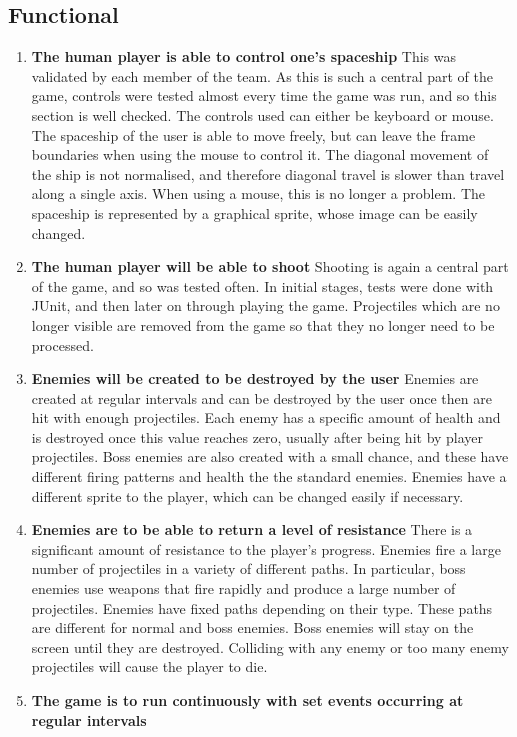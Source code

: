 \subsection{Functional}
\begin{enumerate}
\item \textbf{The human player is able to control one's spaceship}
This was validated by each member of the team. As this is such a central part of the game, controls were tested almost every time the game was run, and so this section is well checked. The controls used can either be keyboard or mouse. The spaceship of the user is able to move freely, but can leave the frame boundaries when using the mouse to control it. The diagonal movement of the ship is not normalised, and therefore diagonal travel is slower than travel along a single axis. When using a mouse, this is no longer a problem. The spaceship is represented by a graphical sprite, whose image can be easily changed.
\item \textbf{The human player will be able to shoot}
Shooting is again a central part of the game, and so was tested often. In initial stages, tests were done with JUnit, and then later on through playing the game. Projectiles which are no longer visible are removed from the game so that they no longer need to be processed.
\item \textbf{Enemies will be created to be destroyed by the user}
Enemies are created at regular intervals and can be destroyed by the user once then are hit with enough projectiles. Each enemy has a specific amount of health and is destroyed once this value reaches zero, usually after being hit by player projectiles. Boss enemies are also created with a small chance, and these have different firing patterns and health the the standard enemies. Enemies have a different sprite to the player, which can be changed easily if necessary.
\item \textbf{Enemies are to be able to return a level of resistance}
There is a significant amount of resistance to the player's progress. Enemies fire a large number of projectiles in a variety of different paths. In particular, boss enemies use weapons that fire rapidly and produce a large number of projectiles. Enemies have fixed paths depending on their type. These paths are different for normal and boss enemies. Boss enemies will stay on the screen until they are destroyed. Colliding with any enemy or too many enemy projectiles will cause the player to die.
\item \textbf{The game is to run continuously with set events occurring at regular intervals}

\end{enumerate}
